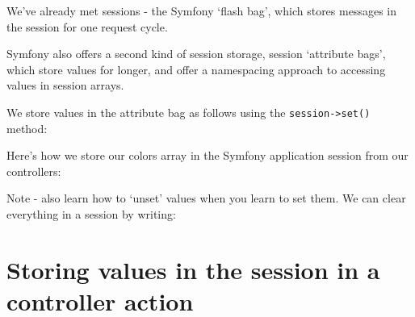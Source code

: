 \documentclass[a4paperpaper,openright]{book}
\newenvironment{Shaded}{}{}
\newcommand{\CommentTok}[1]{\textcolor[rgb]{0.38,0.63,0.69}{\textit{#1}}}
\newcommand{\KeywordTok}[1]{\textcolor[rgb]{0.00,0.44,0.13}{\textbf{#1}}}
\newcommand{\NormalTok}[1]{#1}
\newcommand{\OtherTok}[1]{\textcolor[rgb]{0.00,0.44,0.13}{#1}}
\newcommand{\StringTok}[1]{\textcolor[rgb]{0.25,0.44,0.63}{#1}}
\begin{document}
We've already met sessions - the Symfony `flash bag', which stores
messages in the session for one request cycle.

Symfony also offers a second kind of session storage, session `attribute
bags', which store values for longer, and offer a namespacing approach
to accessing values in session arrays.

We store values in the attribute bag as follows using the
\texttt{session-\textgreater{}set()} method:

\begin{Shaded}
\end{Shaded}

Here's how we store our colors array in the Symfony application session
from our controllers:

\begin{Shaded}
\end{Shaded}

Note - also learn how to `unset' values when you learn to set them. We
can clear everything in a session by writing:

\begin{Shaded}
\end{Shaded}

\hypertarget{storing-values-in-the-session-in-a-controller-action}{%
\section{Storing values in the session in a controller
action}\label{storing-values-in-the-session-in-a-controller-action}}
\end{document}

